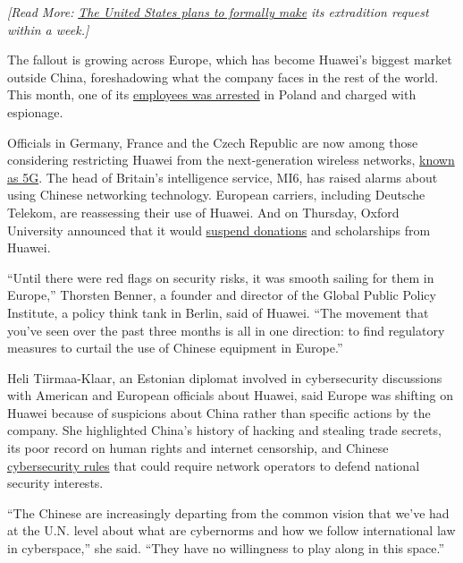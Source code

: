\emph{{[}Read More:}
\href{https://www.nytimes.com/2019/01/22/us/politics/meng-wanzhou-extradition.html?action=click\&module=Intentional\&pgtype=Article}{\emph{The
United States plans to formally make}} \emph{its extradition request
within a week.{]}}

The fallout is growing across Europe, which has become Huawei's biggest
market outside China, foreshadowing what the company faces in the rest
of the world. This month, one of its
\href{https://www.nytimes.com/2019/01/11/world/europe/poland-china-huawei-spy.html}{employees
was arrested} in Poland and charged with espionage.

Officials in Germany, France and the Czech Republic are now among those
considering restricting Huawei from the next-generation wireless
networks,
\href{https://www.nytimes.com/2018/12/31/technology/personaltech/5g-what-you-need-to-know.html?module=inline}{known
as 5G}. The head of Britain's intelligence service, MI6, has raised
alarms about using Chinese networking technology. European carriers,
including Deutsche Telekom, are reassessing their use of Huawei. And on
Thursday, Oxford University announced that it would
\href{https://www.bbc.co.uk/news/business-46911265}{suspend donations}
and scholarships from Huawei.

``Until there were red flags on security risks, it was smooth sailing
for them in Europe,'' Thorsten Benner, a founder and director of the
Global Public Policy Institute, a policy think tank in Berlin, said of
Huawei. ``The movement that you've seen over the past three months is
all in one direction: to find regulatory measures to curtail the use of
Chinese equipment in Europe.''

Heli Tiirmaa-Klaar, an Estonian diplomat involved in cybersecurity
discussions with American and European officials about Huawei, said
Europe was shifting on Huawei because of suspicions about China rather
than specific actions by the company. She highlighted China's history of
hacking and stealing trade secrets, its poor record on human rights and
internet censorship, and Chinese
\href{https://www.nytimes.com/2017/05/31/business/china-cybersecurity-law.html}{cybersecurity
rules} that could require network operators to defend national security
interests.

``The Chinese are increasingly departing from the common vision that
we've had at the U.N. level about what are cybernorms and how we follow
international law in cyberspace,'' she said. ``They have no willingness
to play along in this space.''

